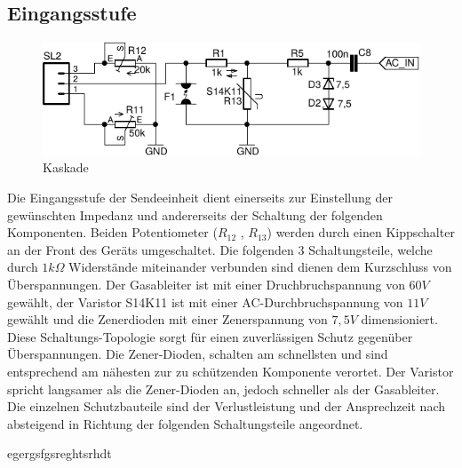 \subsection{Eingangsstufe}
\begin{figure}[H]
\centering
 \includegraphics[scale=1]{gfx/eingangstufe.pdf}
 \caption{Kaskade}
	\label{kaskade} 
\end{figure}
Die Eingangsstufe der Sendeeinheit dient einerseits zur Einstellung der gewünschten Impedanz und andererseits der Schaltung der folgenden Komponenten.
Beiden Potentiometer ($R_{12}$ , $R_{13}$) werden durch einen Kippschalter an der Front des Geräts umgeschaltet. Die folgenden 3 Schaltungsteile, welche durch $1k\Omega$ Widerstände miteinander verbunden sind dienen dem Kurzschluss von Überspannungen. Der Gasableiter ist mit einer Druchbruchspannung von $60V$ gewählt, der Varistor S14K11 ist mit einer AC-Durchbruchspannung von $11V$ gewählt und die Zenerdioden mit einer Zenerspannung von $7,5V$ dimensioniert.\\
Diese Schaltungs-Topologie sorgt für einen zuverlässigen Schutz gegenüber Überspannungen. Die Zener-Dioden, schalten am schnellsten und sind entsprechend am nähesten zur zu schützenden Komponente verortet. Der Varistor spricht langsamer als die Zener-Dioden an, jedoch schneller als der Gasableiter. Die einzelnen Schutzbauteile sind der Verlustleistung und der Ansprechzeit nach absteigend in Richtung der folgenden Schaltungsteile angeordnet.

\begin{floatingfigure}[r]{6.5cm}
}
\caption{Spannungsversorgung}
\label{fig:vkkkcc}
\vspace{0.5cm}
\end{floatingfigure}
\noindent
egergsfgsreghtsrhdt

